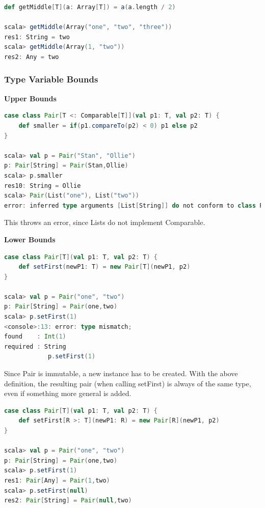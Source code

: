 \begin{lstlisting}[language=scala,mathescape=false]
def getMiddle[T](a: Array[T]) = a(a.length / 2)

scala> getMiddle(Array("one", "two", "three"))
res1: String = two
scala> getMiddle(Array(1, "two"))
res2: Any = two
\end{lstlisting}

\hypertarget{type-variable-bounds}{%
\subsubsection{Type Variable Bounds}\label{type-variable-bounds}}

\textbf{Upper Bounds}

\begin{lstlisting}[language=scala,mathescape=false]
case class Pair[T <: Comparable[T]](val p1: T, val p2: T) {
    def smaller = if(p1.compareTo(p2) < 0) p1 else p2
}

scala> val p = Pair("Stan", "Ollie")
p: Pair[String] = Pair(Stan,Ollie)
scala> p.smaller
res10: String = Ollie
scala> Pair(List("one"), List("two"))
error: inferred type arguments [List[String]] do not conform to class Pair's type parameter bounds [T <: Comparable[T]] new Pair(List("one"), List("two"))
\end{lstlisting}

This throws an error, since Lists do not implement Comparable.

\textbf{Lower Bounds}

\begin{lstlisting}[language=scala,mathescape=false]
case class Pair[T](val p1: T, val p2: T) {
    def setFirst(newP1: T) = new Pair[T](newP1, p2)
}

scala> val p = Pair("one", "two")
p: Pair[String] = Pair(one,two)
scala> p.setFirst(1)
<console>:13: error: type mismatch;
found    : Int(1)
required : String
            p.setFirst(1)
\end{lstlisting}

Since Pair is immutable, a new instance has to be created. With the
above definition, the resulting pair (when calling setFirst) is always
of the same type, even if something more general is added.

\begin{lstlisting}[language=scala,mathescape=false]
case class Pair[T](val p1: T, val p2: T) {
    def setFirst[R >: T](newP1: R) = new Pair[R](newP1, p2)
}

scala> val p = Pair("one", "two")
p: Pair[String] = Pair(one,two)
scala> p.setFirst(1)
res1: Pair[Any] = Pair(1,two)
scala> p.setFirst(null)
res2: Pair[String] = Pair(null,two)
\end{lstlisting}

